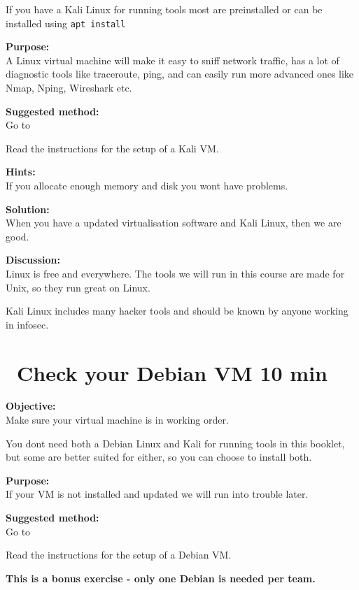 \documentclass[a4paper,11pt,notitlepage]{report}
\begin{document}
If you have a Kali Linux for running tools most are preinstalled or can be installed using \verb+apt install+

{\bf Purpose:}\\
A Linux virtual machine will make it easy to sniff network traffic, has a lot of diagnostic tools like traceroute, ping, and can easily run more advanced ones like Nmap, Nping, Wireshark etc.

{\bf Suggested method:}\\
Go to 

Read the instructions for the setup of a Kali VM.

{\bf Hints:}\\
If you allocate enough memory and disk you wont have problems.

{\bf Solution:}\\
When you have a updated virtualisation software and Kali Linux, then we are good.

{\bf Discussion:}\\
Linux is free and everywhere. The tools we will run in this course are made for Unix, so they run great on Linux.

Kali Linux includes many hacker tools and should be known by anyone working in infosec.

\chapter{\faInfoCircle\ Check your Debian VM 10 min}
\label{ex:sw-basicDebianVM}


{\bf Objective:}\\
Make sure your virtual machine is in working order.

You dont need both a Debian Linux and Kali for running tools in this booklet, but some are better suited for either, so you can choose to install both.

{\bf Purpose:}\\
If your VM is not installed and updated we will run into trouble later.

{\bf Suggested method:}\\
Go to 

Read the instructions for the setup of a Debian VM.

{\Large \bf This is a bonus exercise - only one Debian is needed per team.}
\end{document}
